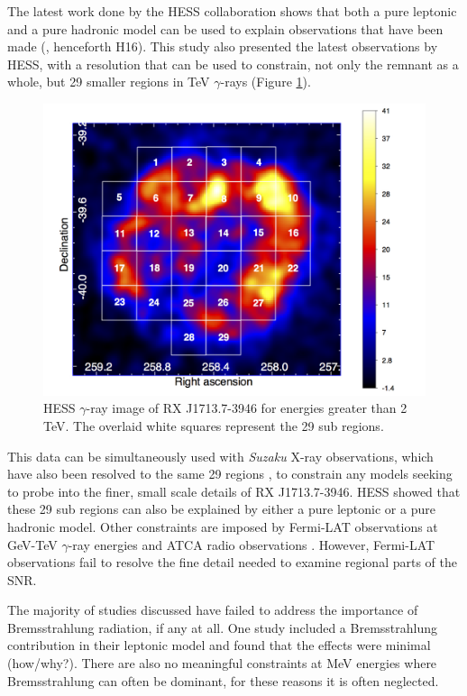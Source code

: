 \documentclass[12pt,a4paper]{article}
\begin{document}
The latest work done by the HESS collaboration shows that both a pure leptonic and a pure hadronic model can be used to explain observations that have been made (\cite{2018A&A...612A...6H}, henceforth H16). This study also presented the latest observations by HESS, with a resolution that can be used to constrain, not only the remnant as a whole, but 29 smaller regions in TeV $\gamma$-rays (Figure \ref{fig:hesssubregions}).
\begin{figure}[H]
	\centering
	\includegraphics[width=0.7\linewidth, height=0.34\textheight]{HESS_subregions}
	\caption{HESS $\gamma$-ray image of RX J1713.7-3946 for energies greater than 2 TeV. The overlaid white squares represent the 29 sub regions.}
	\label{fig:hesssubregions}
\end{figure}
This data can be simultaneously used with \textit{Suzaku} X-ray observations, which have also been resolved to the same 29 regions \citep{2008ApJ...685..988T}, to constrain any models seeking to probe into the finer, small scale details of RX J1713.7-3946. HESS showed that these 29 sub regions can also be explained by either a pure leptonic or a pure hadronic model. Other constraints are imposed by Fermi-LAT observations at GeV-TeV $\gamma$-ray energies and ATCA radio observations \citep{2004ApJ...602..271L}. However, Fermi-LAT observations fail to resolve the fine detail needed to examine regional parts of the SNR.



The majority of studies discussed have failed to address the importance of Bremsstrahlung radiation, if any at all. One study included a Bremsstrahlung contribution in their leptonic model and found that the effects were minimal \citep{2012ApJ...751...65F} (how/why?). There are also no meaningful constraints at MeV energies where Bremsstrahlung can often be dominant, for these reasons it is often neglected.
\end{document}

